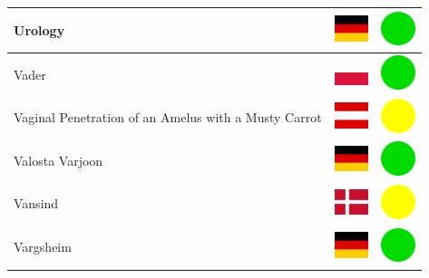 \documentclass[12pt, a4paper, twoside]{report}
\begin{document}
\begin{center}
\begin{longtable}{|p{5cm}|p{2cm}|p{2cm}|}
 Urology                                                    & \includegraphics[width=1cm]{../img/flags/de} &   \includegraphics[width=1cm]{../likes/y} \\ \hline
 Vader                                                      & \includegraphics[width=1cm]{../img/flags/pl} &   \includegraphics[width=1cm]{../likes/y} \\ \hline
 Vaginal Penetration of an Amelus with a Musty Carrot       & \includegraphics[width=1cm]{../img/flags/at} &   \includegraphics[width=1cm]{../likes/m} \\ \hline
 Valosta Varjoon                                            & \includegraphics[width=1cm]{../img/flags/de} &   \includegraphics[width=1cm]{../likes/y} \\ \hline
 Vansind                                                    & \includegraphics[width=1cm]{../img/flags/dk} &   \includegraphics[width=1cm]{../likes/m} \\ \hline
 Vargsheim                                                  & \includegraphics[width=1cm]{../img/flags/de} &   \includegraphics[width=1cm]{../likes/y} \\ \hline

\end{longtable}
\end{center}
\end{document}
